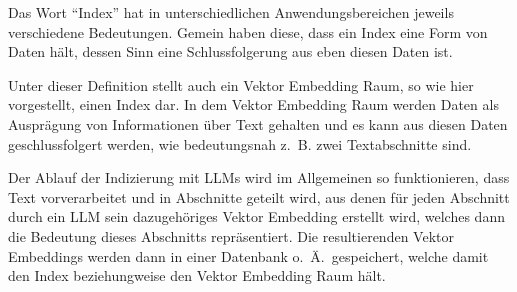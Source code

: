 \documentclass[../main.tex]{subfiles}
\begin{document}
Das Wort \enquote{Index} hat in unterschiedlichen Anwendungsbereichen jeweils verschiedene Bedeutungen.
Gemein haben diese, dass ein Index eine Form von Daten hält, dessen Sinn eine Schlussfolgerung aus eben diesen Daten ist.
~\cite{Chatterjee2017Index,Lo2016What,Vickery1950THE}

Unter dieser Definition stellt auch ein Vektor Embedding Raum, so wie hier vorgestellt, einen Index dar.
In dem Vektor Embedding Raum werden Daten als Ausprägung von Informationen über Text gehalten und es kann aus diesen Daten geschlussfolgert werden, wie bedeutungsnah z. B. zwei Textabschnitte sind.

Der Ablauf der Indizierung mit \glspl{LLM} wird im Allgemeinen so funktionieren, dass Text vorverarbeitet und in Abschnitte geteilt wird, aus denen für jeden Abschnitt durch ein \gls{LLM} sein  dazugehöriges Vektor Embedding erstellt wird, welches dann die Bedeutung dieses Abschnitts repräsentiert.
Die resultierenden Vektor Embeddings werden dann in einer Datenbank o. Ä.\ gespeichert, welche damit den Index beziehungweise den Vektor Embedding Raum hält.
~\cite{ji2022speeding}
\end{document}
